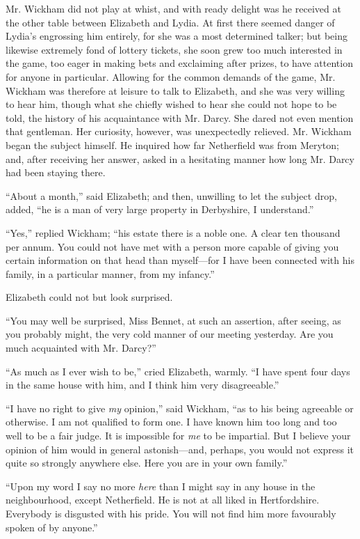 \documentclass[12pt,openright]{book}
\begin{document}
Mr. Wickham did not play at whist, and with ready delight was he received at the other table between Elizabeth and Lydia. At first there seemed danger of Lydia’s engrossing him entirely, for she was a most determined talker; but being likewise extremely fond of lottery tickets, she soon grew too much interested in the game, too eager in making bets and exclaiming after prizes, to have attention for anyone in particular. Allowing for the common demands of the game, Mr. Wickham was therefore at leisure to talk to Elizabeth, and she was very willing to hear him, though what she chiefly wished to hear she could not hope to be told, the history of his acquaintance with Mr. Darcy. She dared not even mention that gentleman. Her curiosity, however, was unexpectedly relieved. Mr. Wickham began the subject himself. He inquired how far Netherfield was from Meryton; and, after receiving her answer, asked in a hesitating manner how long Mr. Darcy had been staying there.

“About a month,” said Elizabeth; and then, unwilling to let the subject drop, added, “he is a man of very large property in Derbyshire, I understand.”

“Yes,” replied Wickham; “his estate there is a noble one. A clear ten thousand per annum. You could not have met with a person more capable of giving you certain information on that head than myself—for I have been connected with his family, in a particular manner, from my infancy.”

Elizabeth could not but look surprised.

“You may well be surprised, Miss Bennet, at such an assertion, after seeing, as you probably might, the very cold manner of our meeting yesterday. Are you much acquainted with Mr. Darcy?”

“As much as I ever wish to be,” cried Elizabeth, warmly. “I have spent four days in the same house with him, and I think him very disagreeable.”

“I have no right to give \textit{my} opinion,” said Wickham, “as to his being agreeable or otherwise. I am not qualified to form one. I have known him too long and too well to be a fair judge. It is impossible for \textit{me} to be impartial. But I believe your opinion of him would in general astonish—and, perhaps, you would not express it quite so strongly anywhere else. Here you are in your own family.”

“Upon my word I say no more \textit{here} than I might say in any house in the neighbourhood, except Netherfield. He is not at all liked in Hertfordshire. Everybody is disgusted with his pride. You will not find him more favourably spoken of by anyone.”
\end{document}
